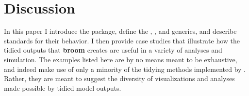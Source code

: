 % 
% 
% 
% 
% 
% 
% 
% 

\section{Discussion}

In this paper I introduce the  package, define the , , and  generics, and describe standards for their behavior. I then provide case studies that illustrate how the tidied outputs that \textbf{broom} creates are useful in a variety of analyses and simulation. The examples listed here are by no means meant to be exhaustive, and indeed make use of only a minority of the tidying methods implemented by . Rather, they are meant to suggest the diversity of visualizations and analyses made possible by tidied model outputs.

